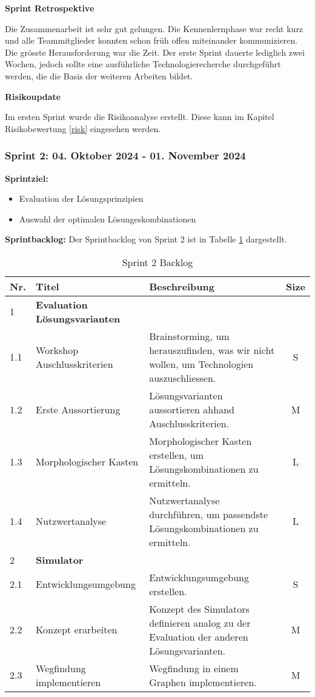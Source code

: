 \textbf{Sprint Retrospektive}

Die Zusammenarbeit ist sehr gut gelungen. Die Kennenlernphase war recht kurz und alle Teammitglieder konnten schon früh offen miteinander kommunizieren. Die grösste Herausforderung war die Zeit. Der erste Sprint dauerte lediglich zwei Wochen, jedoch sollte eine ausführliche Technologierecherche durchgeführt werden, die die Basis der weiteren Arbeiten bildet.

\textbf{Risikoupdate}

Im ersten Sprint wurde die Risikoanalyse erstellt. Diese kann im Kapitel Risikobewertung \ref{risk} eingesehen werden.

\newpage
\subsubsection{Sprint 2: 04. Oktober 2024 - 01. November 2024}

\textbf{Sprintziel:}
\begin{itemize}
    \item Evaluation der Lösungsprinzipien
    \item Auswahl der optimalen Lösungeskombinationen
\end{itemize}

\textbf{Sprintbacklog:} Der Sprintbacklog von Sprint 2 ist in Tabelle \ref{table:sprint2-backlog} dargestellt.


\begin{table}[H]
\centering
\small
\begin{tabularx}{\textwidth}{|l|l|X|c|}
\hline
  \textbf{Nr.} & \textbf{Titel} & \textbf{Beschreibung} & \textbf{Size}\\
  \hline
  1  & \textbf{Evaluation Lösungsvarianten} &&\\
  \hline
  1.1  & Workshop Auschlusskriterien & Brainstorming, um herauszufinden, was wir nicht wollen, um Technologien auszuschliessen. & S\\
  \hline
  1.2 & Erste Aussortierung & Lösungsvarianten aussortieren ahhand Auschlusskriterien. & M\\
  \hline
  1.3 & Morphologischer Kasten & Morphologischer Kasten erstellen, um Lösungskombinationen zu ermitteln. & L\\
  \hline
  1.4 & Nutzwertanalyse & Nutzwertanalyse durchführen, um passendste Lösungskombinationen zu ermitteln. & L\\
  \hline
  2 & \textbf{Simulator} && \\
  \hline
  2.1 & Entwicklungsumgebung & Entwicklungsumgebung erstellen. & S \\
  \hline
  2.2 & Konzept erarbeiten & Konzept des Simulators definieren analog zu der Evaluation der anderen Lösungsvarianten. & M \\
  \hline
  2.3 & Wegfindung implementieren & Wegfindung in einem Graphen implementieren. & M \\
  \hline

\end{tabularx}
\caption{Sprint 2 Backlog}
\label{table:sprint2-backlog}
\end{table}


